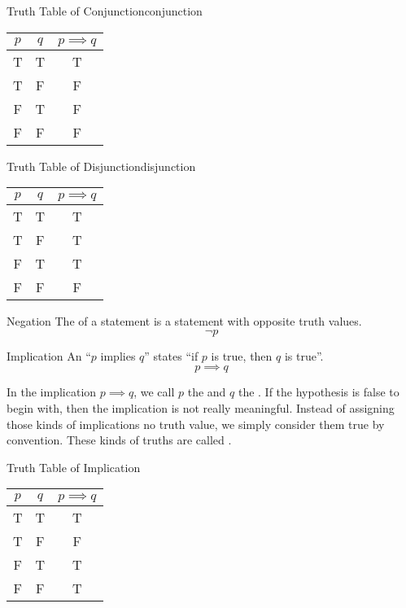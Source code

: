 \begin{exbox}{Truth Table of Conjunction}{conjunction}
    \begin{center}\begin{tabular}{c | c || c}
        $p$ & $q$ & $p \implies q$ \\ \hline
        T & T & T \\
        T & F & F \\
        F & T & F \\
        F & F & F
    \end{tabular}\end{center}
\end{exbox}

\begin{exbox}{Truth Table of Disjunction}{disjunction}
    \begin{center}\begin{tabular}{c | c || c}
        $p$ & $q$ & $p \implies q$ \\ \hline
        T & T & T \\
        T & F & T \\
        F & T & T \\
        F & F & F
    \end{tabular}\end{center}
\end{exbox}



\begin{dfnbox}{Negation}{}
    The  of a statement is a statement with opposite truth values.
    \tcblower
    \[ \neg p \]
\end{dfnbox}

\begin{dfnbox}{Implication}{}
    An  ``$p$ implies $q$'' states ``if $p$ is true, then $q$ is true''.
    \tcblower
    \[ p \implies q \]
\end{dfnbox}

In the implication $p \implies q$, we call $p$ the  and $q$ the . If the hypothesis is false to begin with, then the implication is not really meaningful. Instead of assigning those kinds of implications no truth value, we simply consider them true by convention. These kinds of truths are called .

\begin{exbox}{Truth Table of Implication}{}
    \begin{center}\begin{tabular}{c | c || c}
        $p$ & $q$ & $p \implies q$ \\ \hline
        T & T & T \\
        T & F & F \\
        F & T & T \\
        F & F & T
    \end{tabular}\end{center}
\end{exbox}

